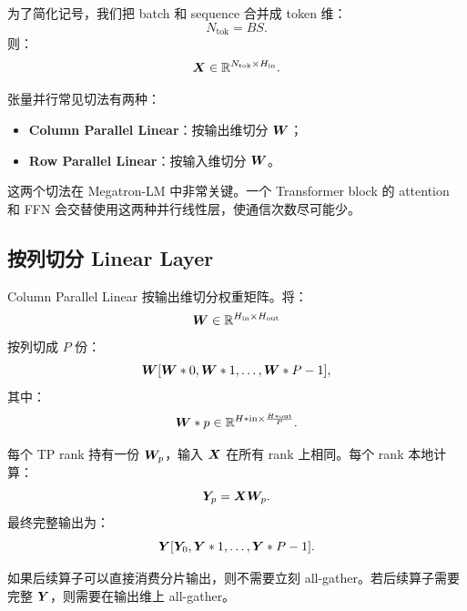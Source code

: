 为了简化记号，我们把 batch 和 sequence 合并成 token 维：
\[
N_{\mathrm{tok}}=B S.
\]
则：
\[
\bm{X}\in\mathbb{R}^{N_{\mathrm{tok}}\times H_{\mathrm{in}}}.
\]

张量并行常见切法有两种：

\begin{itemize}
\item \textbf{Column Parallel Linear}：按输出维切分 $\bm{W}$；
\item \textbf{Row Parallel Linear}：按输入维切分 $\bm{W}$。
\end{itemize}

这两个切法在 Megatron-LM 中非常关键。一个 Transformer block 的 attention 和 FFN 会交替使用这两种并行线性层，使通信次数尽可能少。

\subsection{按列切分 Linear Layer}
\label{subsec:column-parallel-linear}

Column Parallel Linear 按输出维切分权重矩阵。将：
\[
\bm{W}\in\mathbb{R}^{H_{\mathrm{in}}\times H_{\mathrm{out}}}
\]
按列切成 $P$ 份：
\[
\bm{W}
[\bm{W}*0,\bm{W}*1,\ldots,\bm{W}*{P-1}],
\]
其中：
\[
\bm{W}*p\in
\mathbb{R}^{H*{\mathrm{in}}\times \frac{H*{\mathrm{out}}}{P}}.
\]

每个 TP rank 持有一份 $\bm{W}_p$，输入 $\bm{X}$ 在所有 rank 上相同。每个 rank 本地计算：
\[
\bm{Y}_p=\bm{X}\bm{W}_p.
\]
最终完整输出为：
\[
\bm{Y}
[\bm{Y}_0,\bm{Y}*1,\ldots,\bm{Y}*{P-1}].
\]

如果后续算子可以直接消费分片输出，则不需要立刻 all-gather。若后续算子需要完整 $\bm{Y}$，则需要在输出维上 all-gather。

